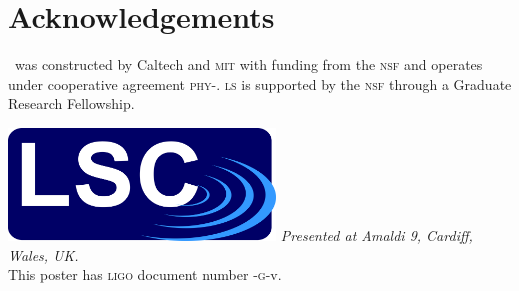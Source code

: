 \documentclass[portrait,plainboxedsections]{sciposter}
\begin{document}
\begin{minipage}[t]{0.25\textwidth}


\end{minipage}%
\hspace{0.05\textwidth}%
\begin{minipage}[t]{0.7\textwidth}
\section*{Acknowledgements}

\LIGO\ was constructed by Caltech and \textsc{mit} with funding from the
\textsc{nsf} and operates under cooperative agreement
\textsc{phy}-. \textsc{ls} is supported by the
\textsc{nsf} through a Graduate Research Fellowship.
\newline\newline

\includegraphics[height=3cm]{figures/LSC_logo}\hspace{7.5mm}
\hspace{7.5mm}
\newline\newline
\emph{Presented at Amaldi 9, Cardiff, Wales, UK.} \\
This poster has \textsc{ligo} document number \LIGO{}-\textsc{g}-v.
\end{minipage}
\end{document}
